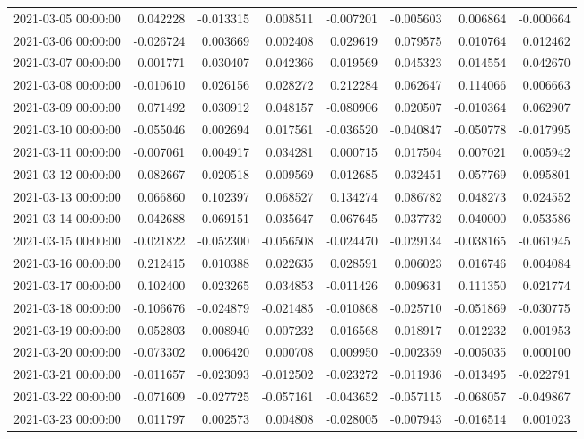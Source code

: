 \begin{tabular}{lrrrrrrr}
2021-03-05 00:00:00 & 0.042228 & -0.013315 & 0.008511 & -0.007201 & -0.005603 & 0.006864 & -0.000664 \\
2021-03-06 00:00:00 & -0.026724 & 0.003669 & 0.002408 & 0.029619 & 0.079575 & 0.010764 & 0.012462 \\
2021-03-07 00:00:00 & 0.001771 & 0.030407 & 0.042366 & 0.019569 & 0.045323 & 0.014554 & 0.042670 \\
2021-03-08 00:00:00 & -0.010610 & 0.026156 & 0.028272 & 0.212284 & 0.062647 & 0.114066 & 0.006663 \\
2021-03-09 00:00:00 & 0.071492 & 0.030912 & 0.048157 & -0.080906 & 0.020507 & -0.010364 & 0.062907 \\
2021-03-10 00:00:00 & -0.055046 & 0.002694 & 0.017561 & -0.036520 & -0.040847 & -0.050778 & -0.017995 \\
2021-03-11 00:00:00 & -0.007061 & 0.004917 & 0.034281 & 0.000715 & 0.017504 & 0.007021 & 0.005942 \\
2021-03-12 00:00:00 & -0.082667 & -0.020518 & -0.009569 & -0.012685 & -0.032451 & -0.057769 & 0.095801 \\
2021-03-13 00:00:00 & 0.066860 & 0.102397 & 0.068527 & 0.134274 & 0.086782 & 0.048273 & 0.024552 \\
2021-03-14 00:00:00 & -0.042688 & -0.069151 & -0.035647 & -0.067645 & -0.037732 & -0.040000 & -0.053586 \\
2021-03-15 00:00:00 & -0.021822 & -0.052300 & -0.056508 & -0.024470 & -0.029134 & -0.038165 & -0.061945 \\
2021-03-16 00:00:00 & 0.212415 & 0.010388 & 0.022635 & 0.028591 & 0.006023 & 0.016746 & 0.004084 \\
2021-03-17 00:00:00 & 0.102400 & 0.023265 & 0.034853 & -0.011426 & 0.009631 & 0.111350 & 0.021774 \\
2021-03-18 00:00:00 & -0.106676 & -0.024879 & -0.021485 & -0.010868 & -0.025710 & -0.051869 & -0.030775 \\
2021-03-19 00:00:00 & 0.052803 & 0.008940 & 0.007232 & 0.016568 & 0.018917 & 0.012232 & 0.001953 \\
2021-03-20 00:00:00 & -0.073302 & 0.006420 & 0.000708 & 0.009950 & -0.002359 & -0.005035 & 0.000100 \\
2021-03-21 00:00:00 & -0.011657 & -0.023093 & -0.012502 & -0.023272 & -0.011936 & -0.013495 & -0.022791 \\
2021-03-22 00:00:00 & -0.071609 & -0.027725 & -0.057161 & -0.043652 & -0.057115 & -0.068057 & -0.049867 \\
2021-03-23 00:00:00 & 0.011797 & 0.002573 & 0.004808 & -0.028005 & -0.007943 & -0.016514 & 0.001023 \\

\end{tabular}
